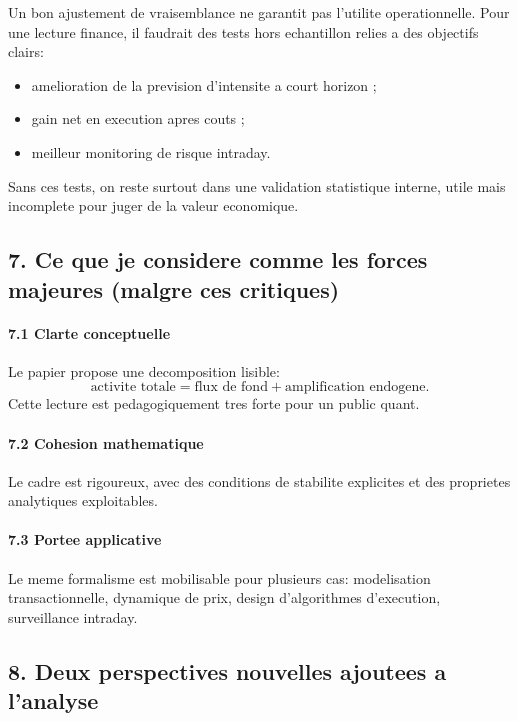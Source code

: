 \documentclass[11pt,a4paper]{article}
\begin{document}
Un bon ajustement de vraisemblance ne garantit pas l'utilite operationnelle. Pour une lecture finance, il faudrait des tests hors echantillon relies a des objectifs clairs:
\begin{itemize}[leftmargin=1.2cm]
    \item amelioration de la prevision d'intensite a court horizon ;
    \item gain net en execution apres couts ;
    \item meilleur monitoring de risque intraday.
\end{itemize}

Sans ces tests, on reste surtout dans une validation statistique interne, utile mais incomplete pour juger de la valeur economique.

\subsection*{7. Ce que je considere comme les forces majeures (malgre ces critiques)}

\paragraph{7.1 Clarte conceptuelle}
Le papier propose une decomposition lisible:
\[
\text{activite totale} = \text{flux de fond} + \text{amplification endogene}.
\]
Cette lecture est pedagogiquement tres forte pour un public quant.

\paragraph{7.2 Cohesion mathematique}
Le cadre est rigoureux, avec des conditions de stabilite explicites et des proprietes analytiques exploitables.

\paragraph{7.3 Portee applicative}
Le meme formalisme est mobilisable pour plusieurs cas: modelisation transactionnelle, dynamique de prix, design d'algorithmes d'execution, surveillance intraday.

\subsection*{8. Deux perspectives nouvelles ajoutees a l'analyse}
\end{document}
